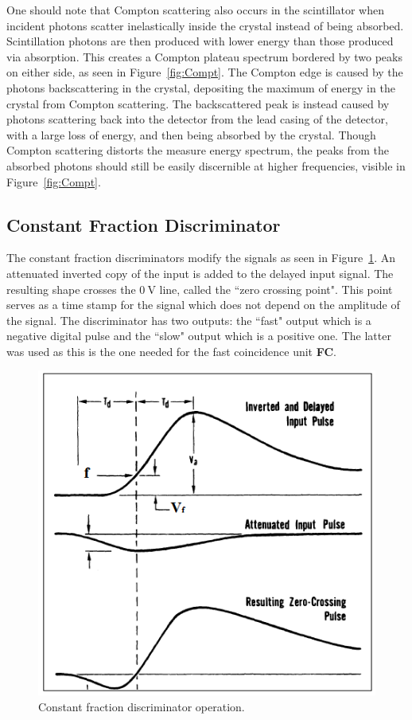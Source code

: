\documentclass[twocolumn]{article}
\begin{document}
\par One should note that Compton scattering also occurs in the scintillator when incident photons scatter inelastically inside the crystal instead of being absorbed. Scintillation photons are then produced with lower energy than those produced via absorption. This creates a Compton plateau spectrum bordered by two peaks on either side, as seen in Figure~\ref{fig:Compt}. The Compton edge is caused by the photons backscattering in the crystal, depositing the maximum of energy in the crystal from Compton scattering. The backscattered peak is instead caused by photons scattering back into the detector from the lead casing of the detector, with a large loss of energy, and then being absorbed by the crystal.\cite{Compton} Though Compton scattering distorts the measure energy spectrum, the peaks from the absorbed photons should still be easily discernible at higher frequencies, visible in Figure~\ref{fig:Compt}.


\subsection{Constant Fraction Discriminator}
The constant fraction discriminators modify the signals as seen in Figure~\ref{fig:cfd}. An attenuated inverted copy of the input is added to the delayed input signal. The resulting shape crosses the $\SI{0}{\volt}$ line, called the ``zero crossing point". This point serves as a time stamp for the signal which does not depend on the amplitude of the signal. The discriminator has two outputs: the ``fast" output which is a negative digital pulse and the ``slow" output which is a positive one. The latter was used as this is the one needed for the fast coincidence unit \textbf{FC}.
\begin{figure}[!h]
	\centering
	\includegraphics[width=0.95\linewidth, height=0.7\linewidth]{cfdnew.png}
	\caption{Constant fraction discriminator operation\cite{cfd}.} 
	\label{fig:cfd}
\end{figure}
\end{document}
